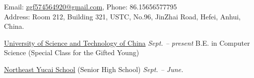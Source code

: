 \documentclass[10pt,a4paper]{article}
\begin{document}
\sloppy  %



\nobreakvspace{0.3em}  %

\noindent Email: \href{mailto:zgf574564920@gmail.com}{\mbox{zgf574564920@gmail.com}}, Phone: \textsmaller{+}86.15656577795
\\
Address: Room 212, Building 321, USTC, No.96, JinZhai Road, Hefei, Anhui, China.

\spacedhrule{0.2em}{-1em}  %


\headedsection  %
{\href{http://ustc.edu.cn/}{University of Science and Technology of China}}
{\textit{Sept. -- present}} {%
	\headedsubsection
	{B.E. in Computer Science (Special Class for the Gifted Young)}
	{}
	{}
}

\headedsection
{\href{http://www.neyc.cn/}{Northeast Yucai School} (Senior High School)}
{\textit{Sept. -- June.}}
{
}


\spacedhrule{0.2em}{-1em}
\end{document}
